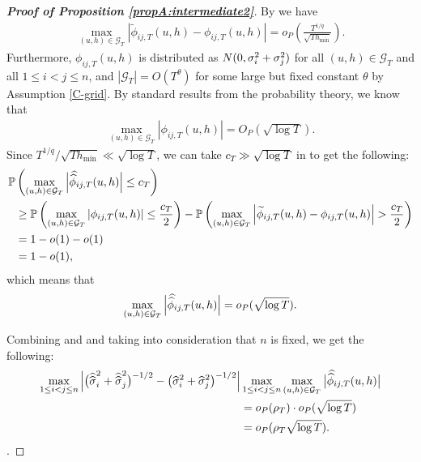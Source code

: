 \documentclass[a4paper,12pt]{article}
\makeatletter
\renewcommand{\eqref}[1]{\tagform@{\ref{#1}}}
\newcommand{\doublehat}[1]{\skew{5.5}\widehat{\widehat{#1}}}
\newcommand{\doublehattwo}[1]{\widehat{\widehat{#1}}}
\makeatother
\begin{document}
\begin{proof}[\textnormal{\textbf{Proof of Proposition \ref{propA:intermediate2}}}]
By \eqref{eq-strongapprox-bound5} we have
\begin{align*}
\max_{(u,h) \in \mathcal{G}_T}\left|\widetilde{\phi}_{ij, T}(u, h) - \phi_{ij, T}(u, h)\right| = o_P\left(\frac{T^{1/q}}{\sqrt{Th_{\min}}}\right).
\end{align*}
Furthermore, $\phi_{ij, T}(u,h)$ is distributed as $ N(0,{\sigma}^2_i + {\sigma}^2_j)$ for all $(u,h) \in \mathcal{G}_T$ and all \linebreak $1\le i < j \le n$, and $|\mathcal{G}_T| = O(T^\theta)$ for some large but fixed constant $\theta$ by \linebreak Assumption \ref{C-grid}. By standard results from the probability theory, we know that
\begin{align*}
\max_{(u,h) \in \mathcal{G}_T}\left|\phi_{ij, T}(u, h)\right| = O_P(\sqrt{\log{T}}).
\end{align*}
Since $T^{1/q}/\sqrt{T h_{\min}} \ll \sqrt{\log T}$, we can take \textcolor{black}{$c_T \gg \sqrt{\log{T}}$} in \eqref{ineq-diff-3} to get the following:
\begin{align*}
\pr&\left(\max_{(u,h) \in \mathcal{G}_T}\Big|\doublehat{\phi}_{ij, T}(u, h)\Big| \leq c_T\right)\\
&\geq \pr \left(\max_{(u,h) \in \mathcal{G}_T}\left|\phi_{ij, T}(u, h)\right| \leq \frac{c_T}{2}\right) - \pr\left(\max_{(u,h) \in \mathcal{G}_T}\left|\widetilde{\phi}_{ij, T}(u, h) - \phi_{ij, T}(u, h)\right| > \frac{c_T}{2} \right)  \\
&= 1 - o(1) - o(1) \\
&= 1 - o(1),
\end{align*}
which means that
\begin{align}\label{ineq-diff-4}
\max_{(u,h) \in \mathcal{G}_T}\Big|\doublehat{\phi}_{ij, T}(u, h)\Big| =o_P(\sqrt{\log{T}}).
\end{align}

Combining \eqref{ineq-diff-2} and \eqref{ineq-diff-4} and taking into consideration that $n$ is fixed, we get the following:
{\color{black}\begin{align}\label{ineq-diff-5}
\begin{split}
\max_{1 \le i < j \le n} \Big|\big(\doublehattwo{\sigma}_i^2 + \doublehattwo{\sigma}_j^2 \big)^{-1/2} - \big(\widehat{\sigma}_i^2 + \widehat{\sigma}_j^2 \big)^{-1/2}\Big|&\max_{1 \le i< j \le n} \max_{(u,h) \in \mathcal{G}_T} \big|\doublehat{\phi}_{ij,T}(u,h)\big| \\
&= o_P(\rho_T) \cdot o_P(\sqrt{\log{T}}) \\
& = o_P(\rho_T \sqrt{\log{T}}).
\end{split}
\end{align}}
.


\end{proof}
\end{document}
